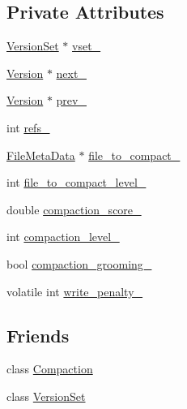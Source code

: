 \subsection*{Private Attributes}
\begin{DoxyCompactItemize}
\item 
\hyperlink{classleveldb_1_1_version_set}{Version\+Set} $\ast$ \hyperlink{classleveldb_1_1_version_ab27cb3e1215e4b948fbee011203098b4}{vset\+\_\+}
\item 
\hyperlink{classleveldb_1_1_version}{Version} $\ast$ \hyperlink{classleveldb_1_1_version_acd5135c980959de4ebb23e73269848f4}{next\+\_\+}
\item 
\hyperlink{classleveldb_1_1_version}{Version} $\ast$ \hyperlink{classleveldb_1_1_version_a78f5343161662289e86f9d53c5995833}{prev\+\_\+}
\item 
int \hyperlink{classleveldb_1_1_version_aa59ecbf976d0d28966892c93c8d8c634}{refs\+\_\+}
\item 
\hyperlink{structleveldb_1_1_file_meta_data}{File\+Meta\+Data} $\ast$ \hyperlink{classleveldb_1_1_version_a2a5c6635d4043415889d2bff1251eabd}{file\+\_\+to\+\_\+compact\+\_\+}
\item 
int \hyperlink{classleveldb_1_1_version_ad141df0d8723b154c4dc7fe283529636}{file\+\_\+to\+\_\+compact\+\_\+level\+\_\+}
\item 
double \hyperlink{classleveldb_1_1_version_ab7194e4f85adf9ca5e933db556bbd572}{compaction\+\_\+score\+\_\+}
\item 
int \hyperlink{classleveldb_1_1_version_ac2edc27f49f9da2c35890e8ec7ada2c1}{compaction\+\_\+level\+\_\+}
\item 
bool \hyperlink{classleveldb_1_1_version_ac9e7faa7fb0648e27fe2c289997a06e4}{compaction\+\_\+grooming\+\_\+}
\item 
volatile int \hyperlink{classleveldb_1_1_version_a3d2d9dc7399ae6808cb4986cdb0024fb}{write\+\_\+penalty\+\_\+}
\end{DoxyCompactItemize}
\subsection*{Friends}
\begin{DoxyCompactItemize}
\item 
class \hyperlink{classleveldb_1_1_version_a9372e882b35d27c78356228e4b758917}{Compaction}
\item 
class \hyperlink{classleveldb_1_1_version_a1827cd1b4d6e9e3c378ce37ca3cce635}{Version\+Set}
\end{DoxyCompactItemize}


